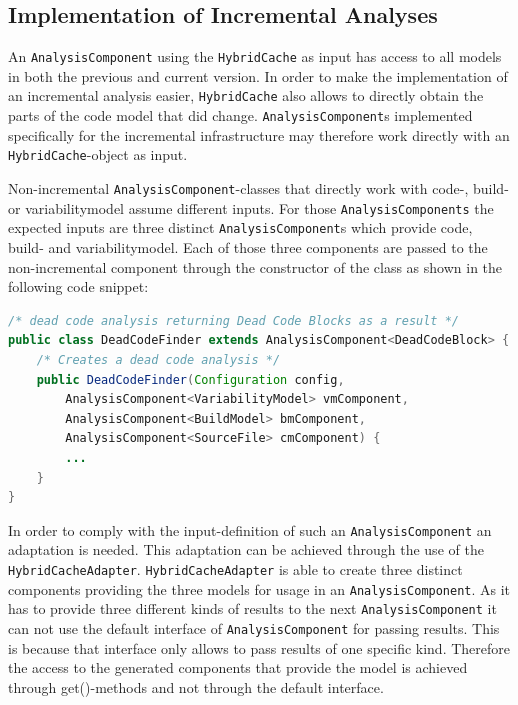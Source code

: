 \documentclass[a4paper]{article}
\begin{document}
\subsection{Implementation of Incremental Analyses}

An \texttt{Analysis\-Component} using the \texttt{Hybrid\-Cache} as input has access to all models in both the previous and current version. In order to make the implementation of an incremental analysis easier, \texttt{Hybrid\-Cache} also allows to directly obtain the parts of the code model that did change. \texttt{Analysis\-Component}s implemented specifically for the incremental infrastructure may therefore work directly with an \texttt{Hybrid\-Cache}-object as input. 

Non-incremental \texttt{Analysis\-Component}-classes that directly work with code-, build- or variabilitymodel assume different inputs. For those \texttt{AnalysisComponents} the expected inputs are three distinct \texttt{Analysis\-Component}s which provide code, build- and variabilitymodel. Each of those three components are passed to the non-incremental component through the constructor of the class as shown in the following code snippet:

\begin{lstlisting}[language=java]
/* dead code analysis returning Dead Code Blocks as a result */
public class DeadCodeFinder extends AnalysisComponent<DeadCodeBlock> {
    /* Creates a dead code analysis */
    public DeadCodeFinder(Configuration config, 
        AnalysisComponent<VariabilityModel> vmComponent, 
        AnalysisComponent<BuildModel> bmComponent, 
        AnalysisComponent<SourceFile> cmComponent) {
        ...
    }
}
\end{lstlisting}

In order to comply with the input-definition of such an \texttt{Analysis\-Component} an adaptation is needed. This adaptation can be achieved through the use of the \texttt{Hybrid\-Cache\-Adapter}. \texttt{Hybrid\-Cache\-Adapter} is able to create three distinct components providing the three models for usage in an \texttt{Analysis\-Component}. As it has to provide three different kinds of results to the next \texttt{Analysis\-Component} it can not use the default interface of \texttt{Analysis\-Component} for passing results. This is because that interface only allows to pass results of one specific kind. Therefore the access to the generated components that provide the model is achieved through get()-methods and not through the default interface. 
\end{document}

